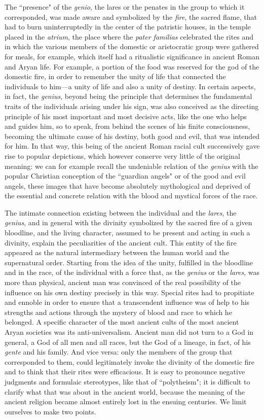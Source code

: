 The ``presence" of the \emph{genio}, the lares or the penates in the group to which it corresponded, was made aware and symbolized by the \emph{fire}, the sacred flame, that had to burn uninterruptedly in the center of the patristic houses, in the temple placed in the \emph{atrium}, the place where the \emph{pater familias} celebrated the rites and in which the various members of the domestic or aristocratic group were gathered for meals, for example, which itself had a ritualistic significance in ancient Roman and Aryan life. For example, a portion of the food was reserved for the god of the domestic fire, in order to remember the unity of life that connected the individuals to him—a unity of life and also a unity of destiny. In certain aspects, in fact, the \emph{genius}, beyond being the principle that determines the fundamental traits of the individuals arising under his sign, was also conceived as the directing principle of his most important and most decisive acts, like the one who helps and guides him, so to speak, from behind the scenes of his finite consciousness, becoming the ultimate cause of his destiny, both good and evil, that was intended for him. In that way, this being of the ancient Roman racial cult successively gave rise to popular depictions, which however conserve very little of the original meaning: we can for example recall the undeniable relation of the \emph{genius} with the popular Christian conception of the ``guardian angels" or of the good and evil angels, these images that have become absolutely mythological and deprived of the essential and concrete relation with the blood and mystical forces of the race.

The intimate connection existing between the individual and the \emph{lares}, the \emph{genius}, and in general with the divinity symbolized by the sacred fire of a given bloodline, and the living character, assumed to be present and acting in such a divinity, explain the peculiarities of the ancient cult. This entity of the fire appeared as the natural intermediary between the human world and the supernatural order. Starting from the idea of the unity, fulfilled in the bloodline and in the race, of the individual with a force that, as the \emph{genius} or the \emph{lares}, was more than physical, ancient man was convinced of the real possibility of the influence on his own destiny precisely in this way. Special rites had to propitiate and ennoble in order to ensure that a transcendent influence was of help to his strengths and actions through the mystery of blood and race to which he belonged. A specific character of the most ancient cults of the most ancient Aryan societies was its anti-universalism. Ancient man did not turn to a God in general, a God of all men and all races, but the God of a lineage, in fact, of his \emph{gente} and his family. And vice versa: only the members of the group that corresponded to them, could legitimately invoke the divinity of the domestic fire and to think that their rites were efficacious. It is easy to pronounce negative judgments and formulaic stereotypes, like that of ``polytheism"; it is difficult to clarify what that was about in the ancient world, because the meaning of the ancient religion became almost entirely lost in the ensuing centuries. We limit ourselves to make two points.

